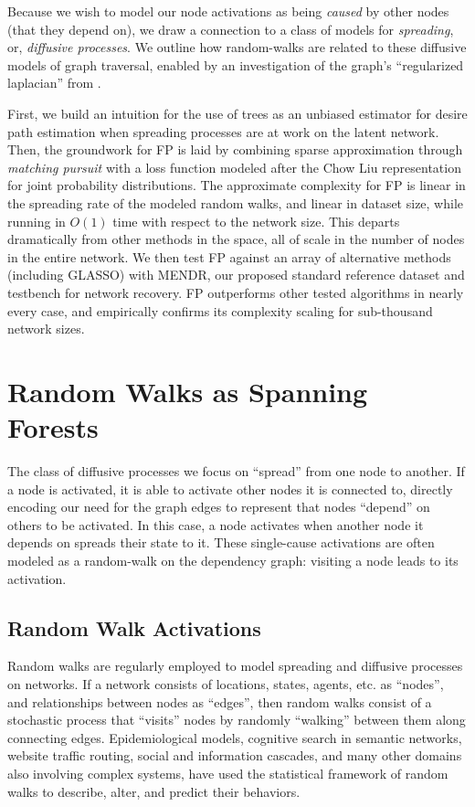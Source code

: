 \documentclass[%
	12pt,
		oneside,
		letterpaper
]{book}
\begin{document}
Because we wish to model our node activations as being \emph{caused} by other nodes (that they depend on), we draw a connection to a class of models for \emph{spreading}, or, \emph{diffusive processes}.
We outline how random-walks are related to these diffusive models of graph traversal, enabled by an investigation of the graph's ``regularized laplacian'' from \textcite{Semisupervisedlearning_Avrachenkov2017}.

First, we build an intuition for the use of trees as an unbiased estimator for desire path estimation when spreading processes are at work on the latent network.
Then, the groundwork for FP is laid by combining sparse approximation through \emph{matching pursuit} with a loss function modeled after the Chow Liu representation for joint probability distributions.
The approximate complexity for FP is linear in the spreading rate of the modeled random walks, and linear in dataset size, while running in \(O(1)\) time with respect to the network size.
This departs dramatically from other methods in the space, all of scale in the number of nodes in the entire network.
We then test FP against an array of alternative methods (including GLASSO) with MENDR, our proposed standard reference dataset and testbench for network recovery.
FP outperforms other tested algorithms in nearly every case, and empirically confirms its complexity scaling for sub-thousand network sizes.

\section{Random Walks as Spanning Forests}\label{random-walks-as-spanning-forests}

The class of diffusive processes we focus on ``spread'' from one node to another.
If a node is activated, it is able to activate other nodes it is connected to, directly encoding our need for the graph edges to represent that nodes ``depend'' on others to be activated.
In this case, a node activates when another node it depends on spreads their state to it.
These single-cause activations are often modeled as a random-walk on the dependency graph: visiting a node leads to its activation.

\subsection{Random Walk Activations}\label{random-walk-activations}

Random walks are regularly employed to model spreading and diffusive processes on networks.
If a network consists of locations, states, agents, etc. as ``nodes'', and relationships between nodes as ``edges'', then random walks consist of a stochastic process that ``visits'' nodes by randomly ``walking'' between them along connecting edges.
Epidemiological models, cognitive search in semantic networks, website traffic routing, social and information cascades, and many other domains also involving complex systems, have used the statistical framework of random walks to describe, alter, and predict their behaviors. \autocite{effectivenessrandomwalks_Kim2023,RobustCascadeReconstruction_Xiao2018,Humanmemorysearch_Jun2015,RandomWalksElectric_Doyle2000,MarkovPerspectiveDevelopment_Mane2011}
\end{document}
